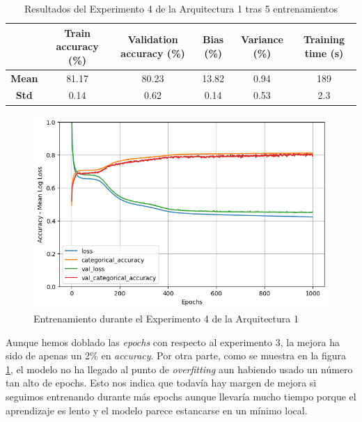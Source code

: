 \documentclass{article}
\begin{document}
			\begin{table}[!h]
				\begin{center}
					\begin{tabular}{ c | c | c | c | c | c |}
						\ & \textbf{Train accuracy (\%)} & \textbf{Validation accuracy (\%)} & \textbf{Bias (\%)} & \textbf{Variance (\%)} & \textbf{Training time (s)} \\ \hline
						\textbf{Mean} & 81.17 & 80.23 & 13.82 & 0.94 & 189\\ \hline
						\textbf{Std} & 0.14 & 0.62 & 0.14 & 0.53 & 2.3 \\ \hline
					\end{tabular}
					\caption{Resultados del Experimento 4 de la Arquitectura 1 tras 5 entrenamientos}
					\label{tab:res-d-a1-e4}
				\end{center}
			\end{table}
			
			\begin{figure}[!h]
				\begin{center}
					\includegraphics[scale=0.5]{d-tr-a1-e4.png}		
					\caption{Entrenamiento durante el Experimento 4 de la Arquitectura 1}	
					\label{d-tr-a1-e4}
				\end{center}
			\end{figure}
			
			Aunque hemos doblado las \textit{epochs} con respecto al experimento 3, la mejora ha sido de apenas un 2\% en \textit{accuracy}. Por otra parte, como se muestra en la figura \ref{d-tr-a1-e4}, el modelo no ha llegado al punto de \textit{overfitting} aun habiendo usado un n\'umero tan alto de epochs. Esto nos indica que todav\'ia hay margen de mejora si seguimos entrenando durante m\'as epochs aunque llevar\'ia mucho tiempo porque el aprendizaje es lento y el modelo parece estancarse en un m\'inimo local.\\
			
\end{document}
